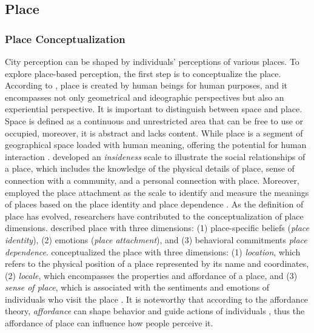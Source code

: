 \documentclass{article}
\begin{document}
\subsection{Place}
\subsubsection{Place Conceptualization}
City perception can be shaped by individuals' perceptions of various places. To explore place-based perception, the first step is to conceptualize the place. According to \cite{tuan_place_1975}, place is created by human beings for human purposes, and it encompasses not only geometrical and ideographic perspectives but also an experiential perspective. It is important to distinguish between space and place. Space is defined as a continuous and unrestricted area that can be free to use or occupied, moreover, it is abstract and lacks content. While place is a segment of geographical space loaded with human meaning, offering the potential for human interaction \citep{tuan_place_1975, agnew_space_2011, cresswell_place_2014}. \cite{relph_place_1976} developed an \textit{insideness} scale to illustrate the social relationships of a place, which includes the knowledge of the physical details of place, sense of connection with a community, and a personal connection with place. Moreover, \cite{williams_measurement_2003} employed the place attachment \citep{altman_place_1992} as the scale to identify and measure the meanings of places based on the place identity \citep{proshansky_city_1978,proshansky_place_1983} and place dependence \citep{stokols_people_1981}. As the definition of place has evolved, researchers have contributed to the conceptualization of place dimensions. \cite{jorgensen_comparative_2006} described place with three dimensions: (1) place-specific beliefs (\textit{place identity}), (2) emotions (\textit{place attachment}), and (3) behavioral commitments \textit{place dependence}. \cite{agnew_space_2011} conceptualized the place with three dimensions: (1) \textit{location}, which refers to the physical position of a place represented by its name and coordinates, (2) \textit{locale}, which encompasses the properties and affordance of a place, and (3) \textit{sense of place}, which is associated with the sentiments and emotions of individuals who visit the place \citep{bahrehdar_description_2018}. It is noteworthy that according to the affordance theory, \textit{affordance} can shape behavior and guide actions of individuals \citep{gibson_theory_1977}, thus the affordance of place can influence how people perceive it. 
\end{document}
